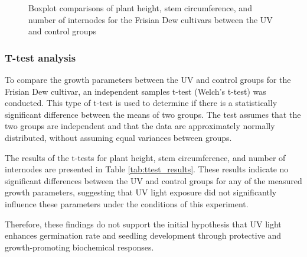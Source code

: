 \begin{figure}[htbp]
    \begin{subfigure}[t]{.32\textwidth}
        
        \label{fig:boxplot_comparison_height}
    \end{subfigure}
    \begin{subfigure}[t]{.32\textwidth}
        
        \label{fig:boxplot_comparison_stem-circumference}
    \end{subfigure}
    \begin{subfigure}[t]{.32\textwidth}
        
        \label{fig:boxplot_comparison_no-internodes}
    \end{subfigure}
    \caption[Comparison of growth parameters for Frisian Dew cultivars]{Boxplot comparisons of plant height, stem circumference, and number of internodes for the Frisian Dew cultivars between the UV and control groups}
    \label{fig:boxplot_comparisons_growth_parameters}
\end{figure}

\subsubsection{T-test analysis}

To compare the growth parameters between the UV and control groups for the Frisian Dew cultivar, an independent samples t-test (Welch's t-test) was conducted. This type of t-test is used to determine if there is a statistically significant difference between the means of two groups. The test assumes that the two groups are independent and that the data are approximately normally distributed, without assuming equal variances between groups.

The results of the t-tests for plant height, stem circumference, and number of internodes are presented in Table \ref{tab:ttest_results}. These results indicate no significant differences between the UV and control groups for any of the measured growth parameters, suggesting that UV light exposure did not significantly influence these parameters under the conditions of this experiment.

Therefore, these findings do not support the initial hypothesis that UV light enhances germination rate and seedling development through protective and growth-promoting biochemical responses.

